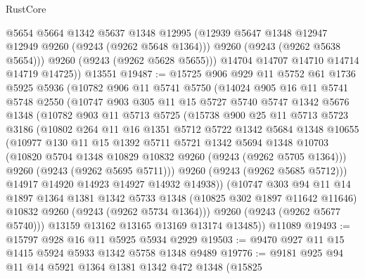 \begin{lexlean}{RustCore}
\begin{coremodule}
            @5654
            @5664
            @1342
            @5637
            @1348
            @12995
            (@12939 @5647 @1348 @12947 @12949 @9260 (@9243 (@9262 @5648 @1364)))
            @9260
            (@9243 (@9262 @5638 @5654)))
          @9260
          (@9243 (@9262 @5628 @5655)))
        @14704
        @14707
        @14710
        @14714
        @14719
        @14725))
    @13551
@19487 := @15725
    @906
    @929
    @11
    @5752
    @61
    @1736
    @5925
    @5936
    (@10782
      @906
      @11
      @5741
      @5750
      (@14024
        @905
        @16
        @11
        @5741
        @5748
        @2550
        (@10747
          @903
          @305
          @11
          @15
          @5727
          @5740
          @5747
          @1342
          @5676
          @1348
          (@10782
            @903
            @11
            @5713
            @5725
            (@15738
              @900
              @25
              @11
              @5713
              @5723
              @3186
              (@10802
                @264
                @11
                @16
                @1351
                @5712
                @5722
                @1342
                @5684
                @1348
                @10655
                (@10977
                  @130
                  @11
                  @15
                  @1392
                  @5711
                  @5721
                  @1342
                  @5694
                  @1348
                  @10703
                  (@10820 @5704 @1348 @10829 @10832 @9260 (@9243 (@9262 @5705 @1364)))
                  @9260
                  (@9243 (@9262 @5695 @5711)))
                @9260
                (@9243 (@9262 @5685 @5712)))
              @14917
              @14920
              @14923
              @14927
              @14932
              @14938))
          (@10747
            @303
            @94
            @11
            @14
            @1897
            @1364
            @1381
            @1342
            @5733
            @1348
            (@10825 @302 @1897 @11642 @11646)
            @10832
            @9260
            (@9243 (@9262 @5734 @1364)))
          @9260
          (@9243 (@9262 @5677 @5740)))
        @13159
        @13162
        @13165
        @13169
        @13174
        @13485))
    @11089
@19493 := @15797 @928 @16 @11 @5925 @5934 @2929
@19503 := @9470 @927 @11 @15 @1415 @5924 @5933 @1342 @5758 @1348 @9489
@19776 := @9181
    @925
    @94
    @11
    @14
    @5921
    @1364
    @1381
    @1342
    @472
    @1348
    (@15825

\end{coremodule}
\end{lexlean}
